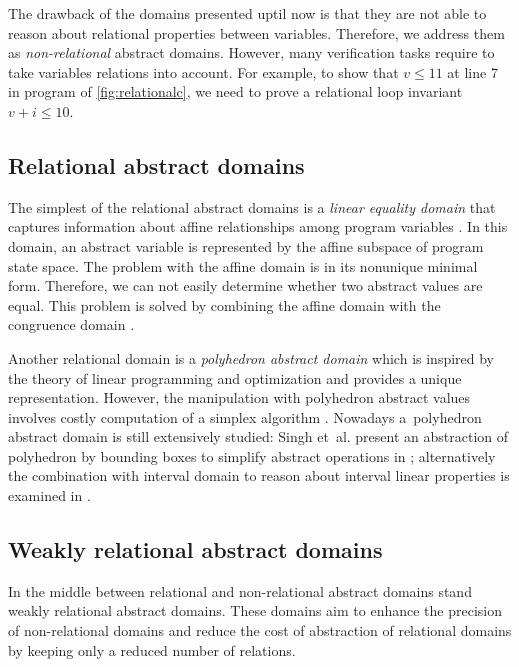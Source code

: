 The drawback of the domains presented uptil now is that they are not able to reason about
relational properties between variables. Therefore, we address them as
\emph{non-relational} abstract domains.  However, many verification tasks
require to take variables relations into account.  For example, to show that $v \leq 11$
at line 7 in program of \autoref{fig:relationalc}, we need to prove a
relational loop invariant $v + i
\leq 10$.


\subsection{Relational abstract domains}

The simplest of the relational abstract domains is a \emph{linear equality
domain} that captures information about affine relationships among program
variables \cite{Karr1976}. In this domain, an abstract variable is represented
by the affine subspace of program state space. The problem with the affine
domain is in its nonunique minimal form. Therefore, we can not easily determine
whether two abstract values are equal. This problem is solved by combining
the affine domain with the congruence domain \cite{Granger1991}.

Another relational domain is a \emph{polyhedron abstract domain} which is
inspired by the theory of linear programming and optimization \cite{Cousot1978, Venet2012}
and provides a unique representation. However, the manipulation with polyhedron
abstract values involves costly computation of a simplex algorithm
\cite{Schrijver1986}. Nowadays a~polyhedron abstract domain is still
extensively studied: Singh et~al. present an abstraction of polyhedron by
bounding boxes to simplify abstract operations in \cite{Singh2017};
alternatively the combination with interval domain to reason about interval
linear properties is examined in \cite{Chen2009}.

\subsection{Weakly relational abstract domains}

In the middle between relational and non-relational abstract domains stand
weakly relational abstract domains. These domains aim to enhance the precision
of non-relational domains and reduce the cost of abstraction of relational
domains by keeping only a reduced number of relations.

